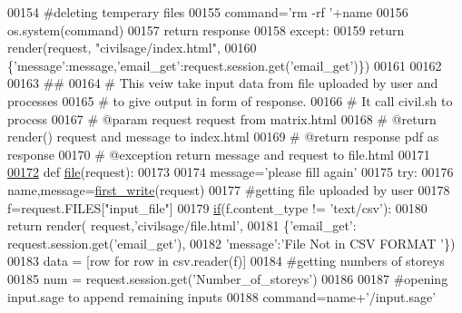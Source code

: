 \begin{DoxyCode}
00154             \textcolor{comment}{#deleting temperary files}
00155             command=\textcolor{stringliteral}{'rm -rf '}+name
00156             os.system(command)
00157             \textcolor{keywordflow}{return} response
00158     \textcolor{keywordflow}{except}:
00159         \textcolor{keywordflow}{return} render(request, \textcolor{stringliteral}{"civilsage/index.html"},
00160         \{\textcolor{stringliteral}{'message'}:message,\textcolor{stringliteral}{'email\_get'}:request.session.get(\textcolor{stringliteral}{'email\_get'})\})
00161 
00162 
00163 \textcolor{comment}{##}
00164 \textcolor{comment}{# This veiw take input data from file uploaded by user and processes}
00165 \textcolor{comment}{# to give output in form of response.}
00166 \textcolor{comment}{# It call civil.sh to process}
00167 \textcolor{comment}{# @param request request from matrix.html}
00168 \textcolor{comment}{# @return render() request and message to index.html }
00169 \textcolor{comment}{# @return response pdf as response }
00170 \textcolor{comment}{# @exception return message and request to file.html}
00171 
\hypertarget{views_8py_source_l00172}{}\hyperlink{namespacecivilsage_1_1views_a32de127956738677913352a2db84ecdb}{00172} \textcolor{keyword}{def }\hyperlink{namespacecivilsage_1_1views_a32de127956738677913352a2db84ecdb}{file}(request):
00173 
00174     message=\textcolor{stringliteral}{'please fill again'}
00175     \textcolor{keywordflow}{try}:
00176         name,message=\hyperlink{namespacecivilsage_1_1views_ad9397359f36a9df37e0aa43f3be032a3}{first\_write}(request)
00177         \textcolor{comment}{#getting file uploaded by user}
00178         f=request.FILES[\textcolor{stringliteral}{"input\_file"}]
00179         \hyperlink{bootstrap_8min_8js_ac2d69f5011896c6ed4a54e0dd36f6334}{if}(f.content\_type != \textcolor{stringliteral}{'text/csv'}):
00180             \textcolor{keywordflow}{return} render( request,\textcolor{stringliteral}{'civilsage/file.html'},
00181             \{\textcolor{stringliteral}{'email\_get'}: request.session.get(\textcolor{stringliteral}{'email\_get'}),
00182             \textcolor{stringliteral}{'message'}:\textcolor{stringliteral}{'File Not in CSV FORMAT '}\})
00183         data = [row \textcolor{keywordflow}{for} row \textcolor{keywordflow}{in} csv.reader(f)]
00184         \textcolor{comment}{#getting numbers of storeys}
00185         num = request.session.get(\textcolor{stringliteral}{'Number\_of\_storeys'})
00186 
00187         \textcolor{comment}{#opening input.sage to append remaining inputs}
00188         command=name+\textcolor{stringliteral}{'/input.sage'}

\end{DoxyCode}
